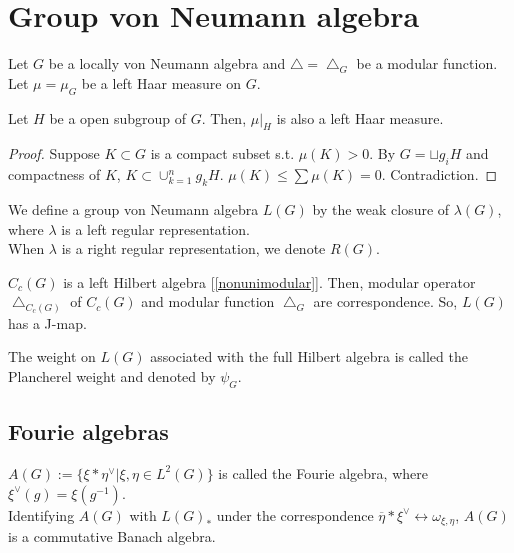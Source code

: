 \section{Group von Neumann algebra}

Let $G$ be a locally von Neumann algebra and $\bigtriangleup = \bigtriangleup_G$ be a modular function.
Let $\mu = \mu_G$ be a left Haar measure on $G$.

\begin{lemma}
  Let $H$ be a open subgroup of $G$. Then, $\mu|_H$ is also a left Haar measure.
\end{lemma}

\begin{proof}
  Suppose $K \subset G$ is a compact subset s.t. $\mu(K)>0$.
  By $G = \sqcup g_i H$ and compactness of $K$, $K \subset \cup_{k=1}^n g_k H$.
  $\mu(K) \leq \sum \mu(K) = 0$. Contradiction.
\end{proof}


\begin{definition}
  We define a group von Neumann algebra $L(G)$ by the weak closure of $\lambda(G)$, where $\lambda$ is a left regular representation.\\
  When $\lambda$ is a right regular representation, we denote $R(G)$. \\
\end{definition}

$C_c(G)$ is a left Hilbert algebra [\ref{nonunimodular}]. 
Then, modular operator $\bigtriangleup_{C_c(G)}$ of $C_c(G)$ and modular function $\bigtriangleup_G$ are correspondence.
So, $L(G)$ has a J-map.

\begin{definition}
  The weight on $L(G)$ associated with the full Hilbert algebra is called the Plancherel weight and denoted by $\psi_G$.
\end{definition}

\subsection{Fourie algebras}

\begin{definition}
  $A(G) := \{ \xi*\eta^{\vee} | \xi, \eta \in L^2(G)\}$ is called the Fourie algebra, where $\xi^{\vee}(g) = \xi(g^{-1})$. \\
  Identifying $A(G)$ with $L(G)_*$ under the correspondence $\overline{\eta}*\xi^{\vee} \leftrightarrow \omega_{\xi,\eta}$,
  $A(G)$ is a commutative Banach algebra.
\end{definition}

